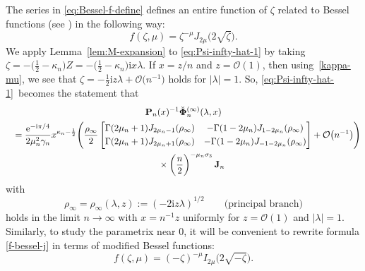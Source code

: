 \documentclass[11pt]{article}
\numberwithin{equation}{section}
\numberwithin{equation}{section}
\newcommand{\ee}{\mathrm{e}}
\newcommand{\ii}{\mathrm{i}}
\newcommand{\para}[1]{\breve{#1}}
\begin{document}
The series in \eqref{eq:Bessel-f-define} defines an entire function of $\zeta$ related to Bessel functions (see \cite[Chapter~10]{DLMF}) in the following way:
\begin{equation}
\label{f-bessel-j}
 f(\zeta,\mu)=\zeta^{-{\mu}{}}J_{2\mu}\big(2\sqrt{\zeta}\big).
\end{equation}
We apply Lemma~\ref{lem:M-expansion} to \eqref{eq:Psi-infty-hat-1} by taking $\zeta=-\big(\frac{1}{2}-\kappa_n\big)Z=-\big(\frac{1}{2}-\kappa_n\big)\ii x\lambda$. If $x=z/n$ and $z=\mathcal{O}(1)$, then using~\eqref{kappa-mu}, we see that $\zeta=-\frac{1}{2}\ii z\lambda + \mathcal{O}\big(n^{-1}\big)$ holds for $|\lambda|=1$. So, \eqref{eq:Psi-infty-hat-1}~becomes the statement that
\begin{gather*}
 \mathbf{P}_n(x)^{-1}\para{\mathbf{\Phi}}_n^{(\infty)}(\lambda,x)
\\
\quad=\frac{\ee^{-\ii\pi/4}}{2\mu_n^2\gamma_n}x^{\kappa_n-\frac{1}{2}}\Bigg(\frac{\rho_\infty}{2}\begin{bmatrix}
 \Gamma(2\mu_n+1) J_{2\mu_n-1}(\rho_\infty) & -\Gamma(1-2\mu_n) J_{1-2\mu_n}(\rho_\infty) \vspace{1mm}\\
 \Gamma(2\mu_n+1) J_{2\mu_n+1}(\rho_\infty) & -\Gamma(1-2\mu_n) J_{-1-2\mu_n}(\rho_\infty)
 \end{bmatrix}+\mathcal{O}\big(n^{-1}\big)\Bigg) \\
 \phantom{\quad=}{}\times\left(\dfrac{n}{2} \right)^{-\mu_n \sigma_3}
 \mathbf{J}_n
\end{gather*}
with
\begin{equation}
 \rho_\infty=\rho_\infty(\lambda,z):=(-2\ii z\lambda)^{1/2}\qquad\text{(principal branch)}
 \label{eq:rho-infty-branch}
\end{equation}
holds in the limit $n\to\infty$ with $x=n^{-1}z$ uniformly for $z=\mathcal{O}(1)$ and $|\lambda|=1$. Similarly, to study the parametrix near 0, it will be convenient to rewrite formula \eqref{f-bessel-j} in terms of modified Bessel functions:
\begin{equation*}
 f(\zeta, \mu) = (-\zeta)^{-\mu} I_{2\mu}\big(2 \sqrt{-\zeta} \big).
\end{equation*}
\end{document}
